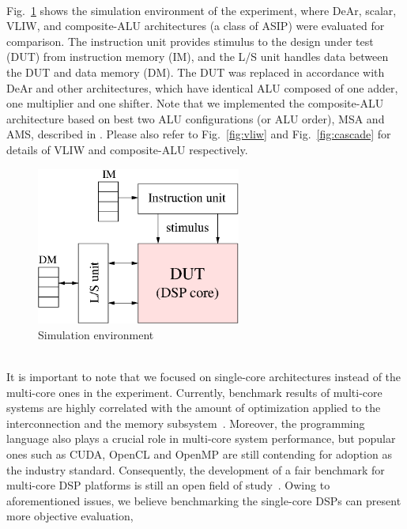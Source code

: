 \\\indent Fig.~\ref{fig:sim} shows the simulation environment of the experiment, 
where DeAr, scalar, VLIW, and composite-ALU architectures (a class of ASIP) \cite{cascade} were evaluated for comparison. 
The instruction unit provides stimulus to the design under test (DUT) from instruction memory (IM),
and the L/S unit handles data between the DUT and data memory (DM).
The DUT was replaced in accordance with DeAr and other architectures, 
which have identical ALU composed of one adder, one multiplier and one shifter.
Note that we implemented the composite-ALU architecture based on best two ALU configurations (or ALU order), MSA and AMS, described in \cite{cascade}.
Please also refer to Fig.~\ref{fig:vliw} and Fig.~\ref{fig:cascade} for details of VLIW and composite-ALU respectively.
\vspace{\textfig}
\begin{figure}[!ht] 
    \centering
    \includegraphics[width=0.6\textwidth]{./figs/sim.eps}
    \caption{Simulation environment}
    \label{fig:sim}
\end{figure}
\\\indent 
It is important to note that we focused on single-core architectures instead of the multi-core ones in the experiment.
Currently, benchmark results of multi-core systems are highly correlated with the amount of optimization applied to the interconnection and the memory subsystem~\cite{trends}.
Moreover, the programming language also plays a crucial role in multi-core system performance, 
but popular ones such as CUDA, OpenCL and OpenMP are still contending for adoption as the industry standard.
Consequently, the development of a fair benchmark for multi-core DSP platforms is still an open field of study~\cite{landscape}.
Owing to aforementioned issues, we believe benchmarking the single-core DSPs can present more objective evaluation, 
